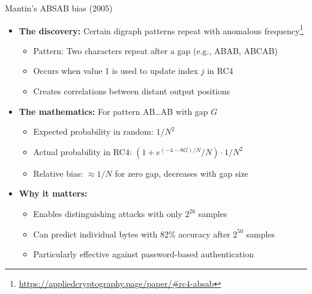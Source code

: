 \documentclass[aspectratio=169, lualatex, handout]{beamer}
\begin{document}
\begin{frame}{Mantin's ABSAB bias (2005)}
	\begin{itemize}[<+->]
		\item \textbf{The discovery:} Certain digraph patterns repeat with anomalous frequency\footnote{\url{https://appliedcryptography.page/paper/\#rc4-absab}}
		      \begin{itemize}[<+->]
			      \item Pattern: Two characters repeat after a gap (e.g., ABAB, ABCAB)
			      \item Occurs when value 1 is used to update index $j$ in RC4
			      \item Creates correlations between distant output positions
		      \end{itemize}
		\item \textbf{The mathematics:} For pattern AB\ldots AB with gap $G$
		      \begin{itemize}[<+->]
			      \item Expected probability in random: $1/N^2$
			      \item Actual probability in RC4: $(1 + e^{(-4-8G)/N}/N) \cdot 1/N^2$
			      \item Relative bias: $\approx 1/N$ for zero gap, decreases with gap size
		      \end{itemize}
		\item \textbf{Why it matters:}
		      \begin{itemize}[<+->]
			      \item Enables distinguishing attacks with only $2^{26}$ samples
			      \item Can predict individual bytes with 82\% accuracy after $2^{50}$ samples
			      \item Particularly effective against password-based authentication
		      \end{itemize}
	\end{itemize}
\end{frame}
\end{document}
